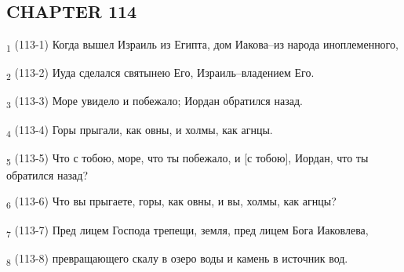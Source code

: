 \subsection{CHAPTER 114}
\begin{tcolorbox}
\textsubscript{1} (113-1) Когда вышел Израиль из Египта, дом Иакова--из народа иноплеменного,
\end{tcolorbox}
\begin{tcolorbox}
\textsubscript{2} (113-2) Иуда сделался святынею Его, Израиль--владением Его.
\end{tcolorbox}
\begin{tcolorbox}
\textsubscript{3} (113-3) Море увидело и побежало; Иордан обратился назад.
\end{tcolorbox}
\begin{tcolorbox}
\textsubscript{4} (113-4) Горы прыгали, как овны, и холмы, как агнцы.
\end{tcolorbox}
\begin{tcolorbox}
\textsubscript{5} (113-5) Что с тобою, море, что ты побежало, и [с тобою], Иордан, что ты обратился назад?
\end{tcolorbox}
\begin{tcolorbox}
\textsubscript{6} (113-6) Что вы прыгаете, горы, как овны, и вы, холмы, как агнцы?
\end{tcolorbox}
\begin{tcolorbox}
\textsubscript{7} (113-7) Пред лицем Господа трепещи, земля, пред лицем Бога Иаковлева,
\end{tcolorbox}
\begin{tcolorbox}
\textsubscript{8} (113-8) превращающего скалу в озеро воды и камень в источник вод.
\end{tcolorbox}
